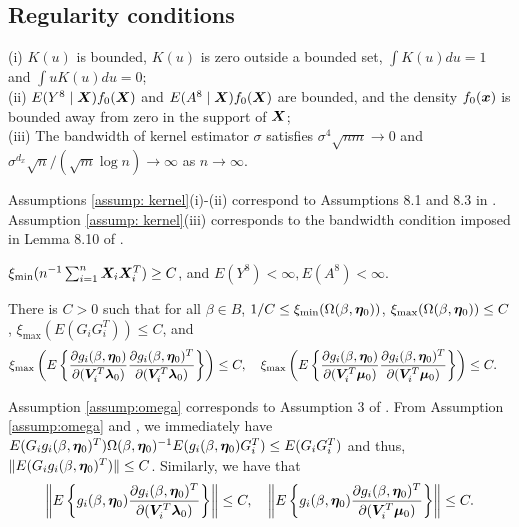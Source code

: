 \documentclass[12pt]{article}
\begin{document}
{\subsection{Regularity conditions}



\begin{assum}[Kernel] \label{assump: kernel}
		(i) $ K(u) $ is bounded, $ K(u) $ is zero outside a bounded set, $ \int K(u) du=1 $ and $ \int uK(u)du=0 $;  \\
		(ii) 	 $  E(Y^8\mid \bm{X}) f_0(\bm{X})$  and  $  E(A^8\mid \bm{X})f_0(\bm{X}) $ are bounded, and 
		the density $ f_0(\bm x) $ is bounded away from zero in the support of $ \bm{X} $; \\
		(iii) The bandwidth of kernel estimator $ \sigma $ satisfies $ \sigma^4 \sqrt{nm}\rightarrow0 $ and $ \sigma^{d_x} \sqrt{n}/(\sqrt{m} \log n)\rightarrow\infty $ as $ n\rightarrow\infty $. 
\end{assum}
Assumptions \ref{assump: kernel}(i)-(ii) correspond to Assumptions 8.1 and 8.3 in \cite{Newey1994_handbook}. Assumption \ref{assump: kernel}(iii) corresponds  to the bandwidth condition imposed in Lemma 8.10 of \cite{Newey1994_handbook}. 


	\begin{assum}\label{assump: moment} 
	$ \xi_{\min} (n^{-1} \sum_{i=1}^{n} \bm{X}_i \bm{X}_i^T ) \geq C$, and $ E(Y^8)< \infty, E(A^8) <\infty$. 
\end{assum}





\begin{assum}\label{assump:omega}
    There is $C>0$ such that for all $ \beta\in B $, 
    $1/C\leq \xi_{\min} (\Omega(\beta, \bm \eta_0))$, $ \xi_{\max} (\Omega(\beta, \bm \eta_0)) \leq C$ ,  $ \xi_{\max} (E(G_iG_i^T))\leq C$, and 
    \begin{align*}
    &\xi_{\max} \left(E\left\{\frac{\partial g_i (\beta, \bm \eta_0 ) }{\partial (\bm{V}_i^T\bm \lambda_0)}  \frac{\partial g_i (\beta, \bm \eta_0 )^T }{\partial (\bm{V}_i^T\bm \lambda_0)}  \right \}\right)\leq C, \quad     \xi_{\max} \left(E\left\{ \frac{\partial g_i (\beta, \bm \eta_0 ) }{\partial (\bm{V}_i^T\bm \mu_0)}    \frac{\partial g_i (\beta, \bm \eta_0 )^T }{\partial (\bm{V}_i^T\bm \mu_0)}  \right \}\right)\leq C.
    \end{align*}

  
    
  
\end{assum}
Assumption \ref{assump:omega} corresponds to Assumption 3 of \cite{Newey:2009aa}.  From Assumption \ref{assump:omega} and  \cite{tripathi1999matrix}, we immediately have $ 	E(G_i g_i(\beta, \bm \eta_0)^T  ) \Omega(\beta, \bm \eta_0)^{-1} 	E( g_i(\beta, \bm \eta_0) G_i^T )  \leq E(G_i G_i^T ) $ and thus, $ \| E(G_i g_i(\beta, \bm \eta_0)^T  )\|\leq C $. Similarly, we have that 
    \[
 \left\| E\left\{  g_i (\beta, \bm \eta_0 ) \frac{\partial g_i (\beta, \bm \eta_0 )^T }{\partial (\bm{V}_i^T\bm \lambda_0)}  \right \}\right\| \leq C, \quad     \left\| E\left\{ g_i (\beta, \bm \eta_0 )   \frac{\partial g_i (\beta, \bm \eta_0 )^T }{\partial (\bm{V}_i^T\bm \mu_0)}  \right \} \right\| \leq C. 
\]


}
\end{document}
